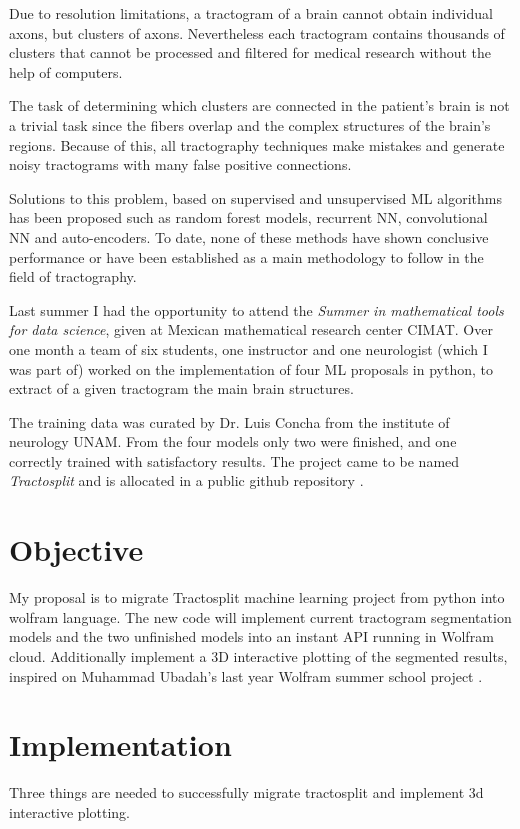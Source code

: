 \documentclass[conference]{IEEEtran}
\begin{document}
Due to resolution limitations, a tractogram of a brain cannot obtain individual axons, but clusters of axons. Nevertheless each tractogram contains thousands of clusters that cannot be processed and filtered for medical research without the help of computers.

The task of determining which clusters are connected in the patient's brain is not a trivial task since the fibers overlap and the complex structures of the brain's regions. Because of this, all tractography techniques make mistakes and generate noisy tractograms with many false positive connections.

Solutions to this problem, based on supervised and unsupervised ML algorithms has been proposed such as random forest models, recurrent NN, convolutional NN and auto-encoders. To date, none of these methods have shown conclusive performance or have been established as a main methodology to follow in the field of tractography.

Last summer I had the opportunity to attend the \textit{Summer in mathematical tools for data science}, given at Mexican mathematical research center CIMAT. Over one month a team of six students, one instructor and one neurologist (which I was part of) worked on the implementation of four ML proposals in python, to extract of a given tractogram the main brain structures.

The training data was curated by Dr. Luis Concha from the institute of neurology UNAM. From the four models only two were finished, and one correctly trained with satisfactory results. The project came to be named \textit{Tractosplit} and is allocated in a public github repository \cite{b1}.

%
%
\section{Objective}
My proposal is to migrate Tractosplit machine learning project from python into wolfram language. The new code will implement current tractogram segmentation models and the two unfinished models into an instant API running in Wolfram cloud. Additionally implement a 3D interactive plotting of the segmented results, inspired on Muhammad Ubadah's last year Wolfram summer school project \cite{b2}.

%
%
\section{Implementation}
Three things are needed to successfully migrate tractosplit and implement 3d interactive plotting.
\end{document}
